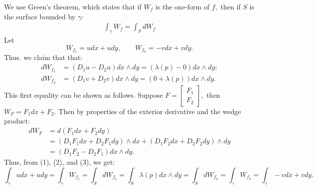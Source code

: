 \documentclass[11pt]{article}
\begin{document}
\begin{solution}
    We use Green's theorem, which states that if $W_f$ is the one-form of $f,$ then if $S$ is the surface bounded by $\gamma:$
    \begin{align}
      \int_\gamma W_f = \int_S dW_f  
    \end{align}
    Let \[W_{f_1} = udx + udy,\qquad W_{f_2} = -vdx + vdy.\] 
    Thus. we claim that that:
    \begin{align}
        dW_{f_1} &= (D_1u - D_2u)dx\wedge dy = (\lambda(p) - 0)dx \wedge dy;\\
        dW_{f_2} &= (D_1v + D_2v)dx\wedge dy = (0 + \lambda(p))dx \wedge dy.
    \end{align}
    This first equality can be shown as follows. Suppose $F = \begin{bmatrix}
        F_1\\ F_2
    \end{bmatrix},$ then $W_F = F_1dx + F_2.$ Then by properties of the exterior derivative and the wedge product:
    \begin{align*}
        dW_{F} &= d(F_1dx + F_2dy)\\ &= (D_1F_1dx + D_2F_1 dy)\wedge dx + (D_1F_2dx + D_2F_2dy)\wedge dy\\ &= (D_1F_2-D_2F_1) dx \wedge dy.
    \end{align*}
    Thus, from (1), (2), and (3), we get:
    \[\int_\gamma udx + udy =\int_\gamma W_{f_1} = \int_S dW_{f_1} = \int_S \lambda(p)dx\wedge dy = \int_S dW_{f_2} =  \int_\gamma W_{f_2} = \int_\gamma -vdx + vdy.\]
\end{solution}


\newpage
\end{document}
